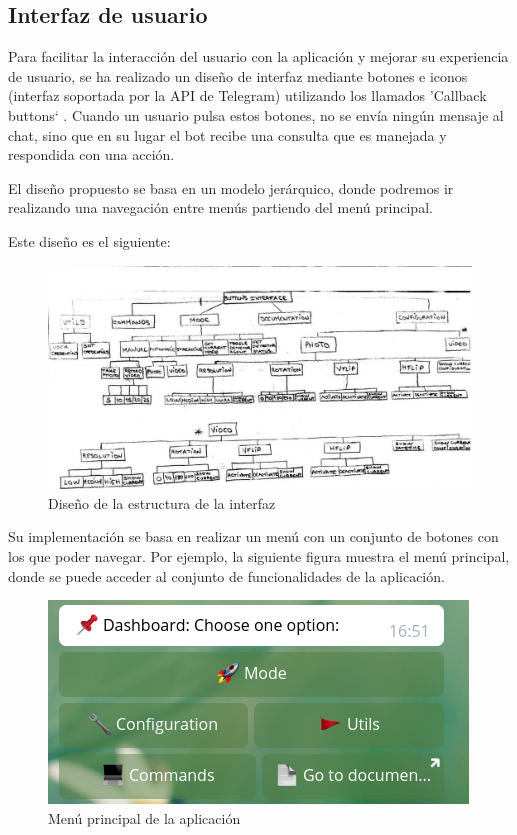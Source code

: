 


\pagestyle{miEstilo505}

\subsection{Interfaz de usuario}

Para facilitar la interacción del usuario con la aplicación y mejorar su experiencia de usuario, se ha realizado un diseño de interfaz mediante botones e iconos (interfaz soportada por la API de Telegram) utilizando los llamados 'Callback buttons` \cite{refx1}. Cuando un usuario pulsa estos botones, no se envía ningún mensaje al chat, sino que en su lugar el bot recibe una consulta que es manejada y respondida con una acción.

El diseño propuesto se basa en un modelo jerárquico, donde podremos ir realizando una navegación entre menús partiendo del menú principal.

Este diseño es el siguiente:

\newpage


\begin{figure}[h]
	\centering
	\includegraphics[scale=0.5]{images/55}
	\caption{Diseño de la estructura de la interfaz}
\end{figure}

Su implementación se basa en realizar un menú con un conjunto de botones con los que poder navegar. Por ejemplo, la siguiente figura muestra el menú principal, donde se puede acceder al conjunto de funcionalidades de la aplicación.

\begin{figure}[h]
	\centering
	\includegraphics[scale=0.8]{images/42}
	\caption{Menú principal de la aplicación}
\end{figure}

